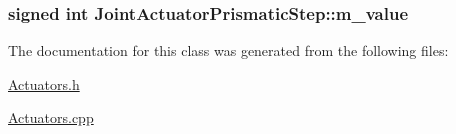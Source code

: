 \hypertarget{classJointActuatorPrismaticStep_a92c61c564dbfc17830ec4109be54f008}{
\subsubsection[{m\-\_\-value}]{\setlength{\rightskip}{0pt plus 5cm}signed int Joint\-Actuator\-Prismatic\-Step\-::m\-\_\-value}}\label{classJointActuatorPrismaticStep_a92c61c564dbfc17830ec4109be54f008}


The documentation for this class was generated from the following files\-:\begin{DoxyCompactItemize}
\item 
\hyperlink{Actuators_8h}{Actuators.\-h}\item 
\hyperlink{Actuators_8cpp}{Actuators.\-cpp}\end{DoxyCompactItemize}
